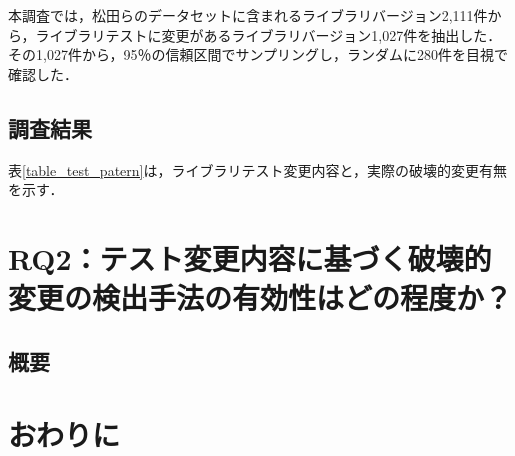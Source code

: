 \documentclass[T,J]{fose} %
\begin{document}
本調査では，松田らのデータセットに含まれるライブラリバージョン2,111件から，ライブラリテストに変更があるライブラリバージョン1,027件を抽出した．その1,027件から，95％の信頼区間でサンプリングし，ランダムに280件を目視で確認した．

\subsection{調査結果}
表\ref{table_test_patern}は，ライブラリテスト変更内容と，実際の破壊的変更有無を示す．






\section{RQ2：テスト変更内容に基づく破壊的変更の検出手法の有効性はどの程度か？}
\subsection{概要}



\section{おわりに}





\end{document}
